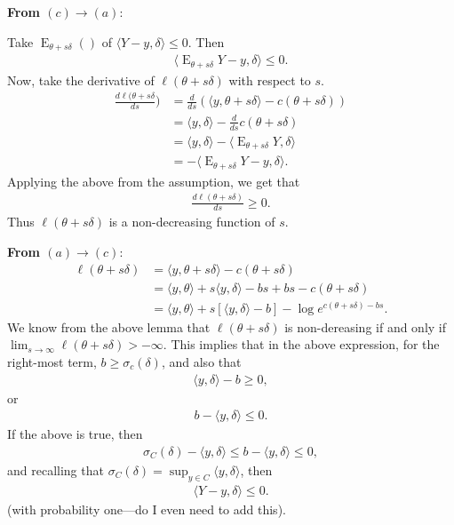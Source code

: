 \documentclass{amsbook}
\DeclareMathOperator{\E}{E}
\newcommand{\deriv}[2]{\frac{d #1}{d #2}}
\newcommand{\inner}[1]{\langle #1 \rangle}
\theoremstyle{definition}
\theoremstyle{remark}
\begin{document}
\textbf{From $(c) \to (a)$}:

Take $\E_{\theta + s \delta}()$ of $\inner{Y-y, \delta} \leq 0$.  Then
\begin{align*}
\inner{ \E_{\theta + s \delta} Y-y, \delta} \leq 0.
\end{align*}
Now, take the derivative of $\ell( \theta + s\delta)$ with respect to $s$.
\begin{align*}
\deriv{\ell( \theta + s \delta}{s}) &= \deriv{}{s} \left (   \inner{y, \theta+s
\delta} - c(\theta+s\delta)  \right )\\
	&= \inner{y, \delta} - \deriv{}{s} c(\theta+s\delta) \\
	&= \inner{y, \delta} - \inner{ \E_{\theta+s\delta}Y,\delta }\\
	&= - \inner{ \E_{\theta+s\delta}Y - y,\delta }.
\end{align*}
Applying the above from the assumption, we get that 
\begin{align*}
\deriv{\ell( \theta + s \delta)}{s} \geq 0.
\end{align*}
Thus $\ell(\theta+s\delta)$ is a non-decreasing function of $s$.

\textbf{From $(a) \to (c)$}:
\begin{align*}
	\ell( \theta+s\delta) &= \inner{y, \theta+s\delta} - c(\theta+s\delta) \\
	&= \inner{y, \theta} + s \inner{y,\delta} -bs +bs - c(\theta+s\delta) \\
	&= \inner{y, \theta} + s [\inner{y,\delta} -b]  - \log e^{c(\theta+s\delta) -bs}.
\end{align*}
We know from the above lemma that $\ell(\theta+s\delta)$ is non-dereasing if and only 
if $\lim_{s \to \infty} \ell(\theta+s\delta) > -\infty$.  This implies that in the 
above expression, for the right-most term, $b \geq \sigma_c(\delta)$, and also that
\begin{align*}
	\inner{y, \delta} - b \geq 0,
\end{align*}
or 
\begin{align*}
	b - \inner{y, \delta}  \leq 0.
\end{align*}
If the above is true, then 
\begin{align*}
	\sigma_C(\delta)  - \inner{y, \delta} \leq b - \inner{y, \delta}  \leq 0,
\end{align*}
and recalling that $\sigma_C(\delta) = \sup_{y \in C} \inner{y, \delta}$, then
\begin{align*}
	\inner{Y - y,\delta } \leq 0.
\end{align*}
(with probability one---do I even need to add this).
\end{document}
